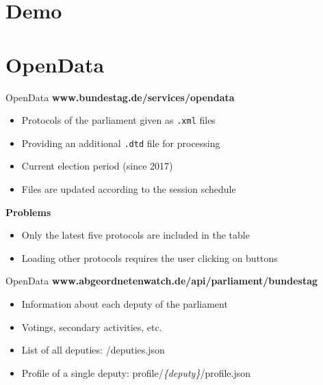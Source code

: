 \documentclass{beamer}
\begin{document}
  \section{Demo}

  \section{OpenData}
  \begin{frame}[plain]{OpenData}
    \textbf{\faAt}\quad\textbf{www.bundestag.de/services/opendata}
    \begin{itemize}
      \item Protocols of the parliament given as \texttt{.xml} files
      \item Providing an additional \texttt{.dtd} file for processing
      \item Current election period (since 2017)
      \item Files are updated according to the session schedule
    \end{itemize}
    \textbf{\faExclamationTriangle}\quad\textbf{Problems}
    \begin{itemize}
      \item Only the latest five protocols are included in the table
      \item Loading other protocols requires the user clicking on buttons
    \end{itemize}  
  \end{frame}

  \begin{frame}[plain]{OpenData}
    \textbf{\faAt}\quad\textbf{www.abgeordnetenwatch.de/api/parliament/bundestag}
    \begin{itemize}
      \item Information about each deputy of the parliament
      \item Votings, secondary activities, etc.
      \item List of all deputies: /deputies.json
      \item Profile of a single deputy: profile/\textit{\{deputy\}}/profile.json
    \end{itemize}
  \end{frame}
\end{document}
